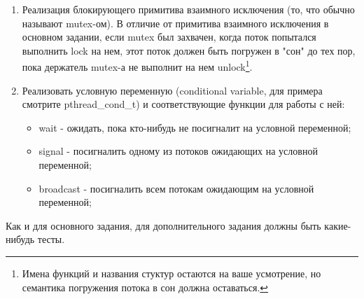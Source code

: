 \begin{enumerate}
  \item Реализация блокирующего примитива взаимного исключения (то, что обычно
        называют mutex-ом). В отличие от примитива взаимного исключения в
        основном задании, если mutex был захвачен, когда поток попытался
        выполнить lock на нем, этот поток должен быть погружен в "сон" до тех
        пор, пока держатель mutex-а не выполнит на нем unlock\footnote{Имена
        функций и названия стуктур остаются на ваше усмотрение, но семантика
        погружения потока в сон должна оставаться.}.
  \item Реализовать условную переменную (conditional variable, для примера
        смотрите pthread\_cond\_t) и соответствующие функции для работы с ней:
    \begin{itemize}
      \item wait - ожидать, пока кто-нибудь не посигналит на условной
            переменной;
      \item signal - посигналить одному из потоков ожидающих на условной
            переменной;
      \item broadcast - посигналить всем потокам ожидающим на условной
            переменной;
    \end{itemize}
\end{enumerate}

Как и для основного задания, для дополнительного задания должны быть
какие-нибудь тесты.
